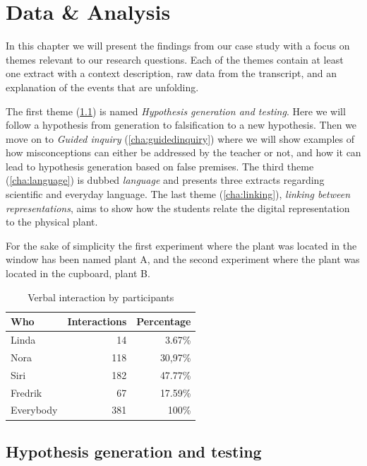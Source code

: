 \chapter{Data \& Analysis}
In this chapter we will present the findings from our case study with a focus on themes relevant to our research questions. Each of the themes contain at least one extract with a context description, raw data from the transcript, and an explanation of the events that are unfolding. 

The first theme (\ref{cha:hypothesisgeneration}) is named \textit{Hypothesis generation and testing}. Here we will follow a hypothesis from generation to falsification to a new hypothesis. Then we move on to \textit{Guided inquiry} (\ref{cha:guidedinquiry}) where we will show examples of how misconceptions can either be addressed by the teacher or not, and how it can lead to hypothesis generation based on false premises. The third theme (\ref{cha:language}) is dubbed \textit{language} and presents three extracts regarding scientific and everyday language. The last theme (\ref{cha:linking}), \textit{linking between representations}, aims to show how the students relate the digital representation to the physical plant.  

For the sake of simplicity the first experiment where the plant was located in the window has been named plant A, and the second experiment where the plant was located in the cupboard, plant B. 


\begin{table}[H]
\begin{center}
	\begin{tabular}{l r r } \toprule
	Who &  Interactions  & Percentage\\ \midrule  
	Linda &	 14  & 3.67\% \\
	Nora&	118 & 30,97\% \\ 
	Siri& 	182 & 47.77\% \\
	Fredrik& 67 & 17.59\% \\ \midrule
	Everybody &	381 & 100\%\\
	\bottomrule
	\end{tabular}
\end{center}
\caption{Verbal interaction by participants}
\end{table}

\section{Hypothesis generation and testing}
\label{cha:hypothesisgeneration}
